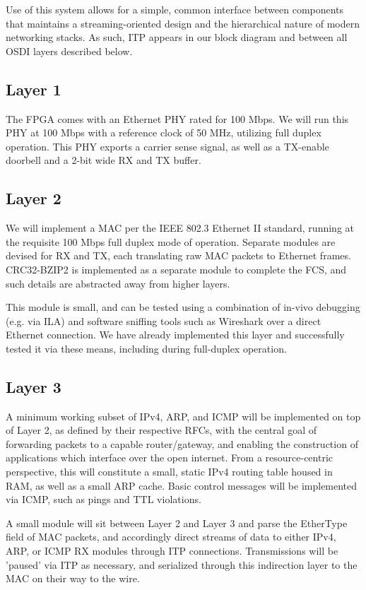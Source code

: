 \documentclass[11pt]{article}
\begin{document}
\noindent Use of this system allows for a simple, common interface between components that maintains a streaming-oriented design and the hierarchical nature of modern networking stacks. As such, ITP appears in our block diagram and between all OSDI layers described below.

\subsection{Layer 1}
The FPGA comes with an Ethernet PHY rated for 100 Mbps. We will run this PHY at 100 Mbps with a reference clock of 50 MHz, utilizing full duplex operation. This PHY exports a carrier sense signal, as well as a TX-enable doorbell and a 2-bit wide RX and TX buffer.

\subsection{Layer 2}
We will implement a MAC per the IEEE 802.3 Ethernet II standard, running at the requisite 100 Mbps full duplex mode of operation. Separate modules are devised for RX and TX, each translating raw MAC packets to Ethernet frames. CRC32-BZIP2 is implemented as a separate module to complete the FCS, and such details are abstracted away from higher layers. \newline

\noindent This module is small, and can be tested using a combination of in-vivo debugging (e.g. via ILA) and software sniffing tools such as Wireshark over a direct Ethernet connection. We have already implemented this layer and successfully tested it via these means, including during full-duplex operation.

\subsection{Layer 3}
A minimum working subset of IPv4, ARP, and ICMP will be implemented on top of Layer 2, as defined by their respective RFCs, with the central goal of forwarding packets to a capable router/gateway, and enabling the construction of applications which interface over the open internet. From a resource-centric perspective, this will constitute a small, static IPv4 routing table housed in RAM, as well as a small ARP cache. Basic control messages will be implemented via ICMP, such as pings and TTL violations.\newline

\noindent A small module will sit between Layer 2 and Layer 3 and parse the EtherType field of MAC packets, and accordingly direct streams of data to either IPv4, ARP, or ICMP RX modules through ITP connections. Transmissions will be 'paused' via ITP as necessary, and serialized through this indirection layer to the MAC on their way to the wire.\newline
\end{document}
